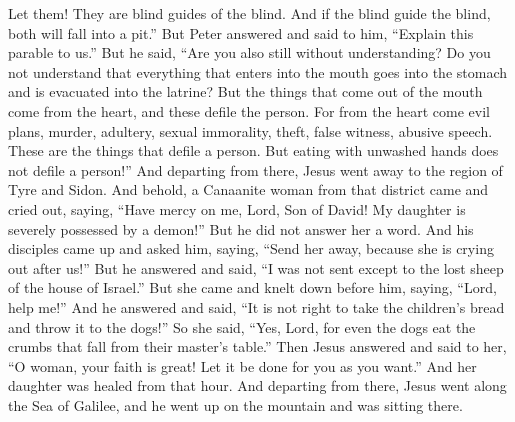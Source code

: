\begin{biblechapter}
\verse Let them! They are blind guides of the blind. And if the blind guide the blind, both will fall into a pit.”
\verse But Peter answered and said to him, “Explain this parable to us.”
\verse But he said, “Are you also still without understanding?
\verse Do you not understand that everything that enters into the mouth goes into the stomach and is evacuated into the latrine?
\verse But the things that come out of the mouth come from the heart, and these defile the person.
\verse For from the heart come evil plans, murder, adultery, sexual immorality, theft, false witness, abusive speech.
\verse These are the things that defile a person. But eating with unwashed hands does not defile a person!”
 And departing from there, Jesus went away to the region of Tyre and Sidon.
\verse And behold, a Canaanite woman from that district came and cried out, saying, “Have mercy on me, Lord, Son of David! My daughter is severely possessed by a demon!”
\verse But he did not answer her a word. And his disciples came up and asked him, saying, “Send her away, because she is crying out after us!”
\verse But he answered and said, “I was not sent except to the lost sheep of the house of Israel.”
\verse But she came and knelt down before him, saying, “Lord, help me!”
\verse And he answered and said, “It is not right to take the children’s bread and throw it to the dogs!”
\verse So she said, “Yes, Lord, for even the dogs eat the crumbs that fall from their master’s table.”
\verse Then Jesus answered and said to her, “O woman, your faith is great! Let it be done for you as you want.” And her daughter was healed from that hour.
 And departing from there, Jesus went along the Sea of Galilee, and he went up on the mountain and was sitting there.

\end{biblechapter}
